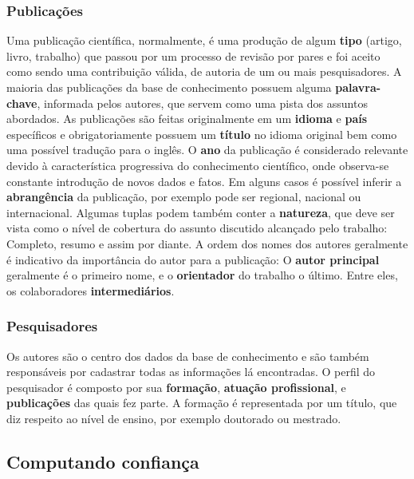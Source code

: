 \documentclass[12pt]{article}
\begin{document}
\subsubsection{Publicações}

Uma publicação científica, normalmente, é uma produção de algum \textbf{tipo} (artigo, livro, trabalho) que passou por um processo de 
revisão por pares e foi aceito como sendo uma contribuição válida, de autoria de um ou mais pesquisadores. A maioria das 
publicações da base de conhecimento possuem alguma \textbf{palavra-chave}, informada pelos autores, que servem como uma pista 
dos assuntos abordados. As publicações são feitas originalmente em um \textbf{idioma} e \textbf{país} específicos e 
obrigatoriamente possuem um \textbf{título} no idioma original bem como uma possível tradução para o inglês. O \textbf{ano} da 
publicação é considerado relevante devido à característica progressiva do conhecimento científico, onde observa-se constante 
introdução de novos dados e fatos. Em alguns casos é possível inferir a \textbf{abrangência} da publicação, por exemplo pode 
ser regional, nacional ou internacional. Algumas tuplas podem também conter a \textbf{natureza}, que deve ser vista como o 
nível de cobertura do assunto discutido alcançado pelo trabalho: Completo, resumo e assim por diante. A ordem dos nomes dos 
autores geralmente é indicativo da importância do autor para a publicação: O \textbf{autor principal} geralmente é o primeiro 
nome, e o \textbf{orientador} do trabalho o último. Entre eles, os colaboradores \textbf{intermediários}.  

\subsubsection{Pesquisadores}

Os autores são o centro dos dados da base de conhecimento e são também responsáveis por cadastrar todas as informações lá 
encontradas. O perfil do pesquisador é composto por sua \textbf{formação}, \textbf{atuação profissional}, e 
\textbf{publicações} das quais fez parte. A formação é representada por um título, que diz respeito ao nível de ensino, por 
exemplo doutorado ou mestrado. 

\newpage

\subsection{Computando confiança} \label{sect:computing-trust}
\end{document}
